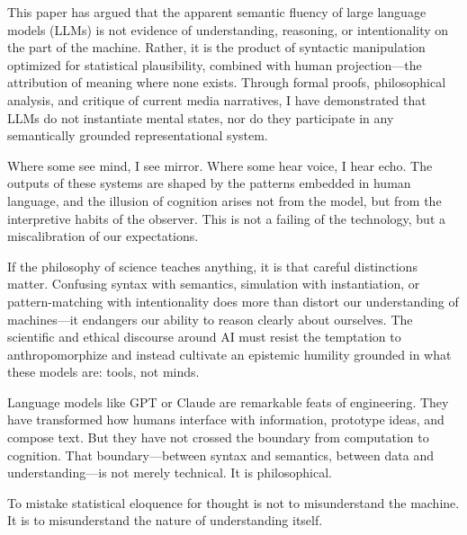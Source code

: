\documentclass[12pt]{article}
\theoremstyle{plain}
\theoremstyle{definition}
\theoremstyle{remark}
\begin{document}
This paper has argued that the apparent semantic fluency of large language models (LLMs) is not evidence of understanding, reasoning, or intentionality on the part of the machine. Rather, it is the product of syntactic manipulation optimized for statistical plausibility, combined with human projection—the attribution of meaning where none exists. Through formal proofs, philosophical analysis, and critique of current media narratives, I have demonstrated that LLMs do not instantiate mental states, nor do they participate in any semantically grounded representational system.

Where some see mind, I see mirror. Where some hear voice, I hear echo. The outputs of these systems are shaped by the patterns embedded in human language, and the illusion of cognition arises not from the model, but from the interpretive habits of the observer. This is not a failing of the technology, but a miscalibration of our expectations.

If the philosophy of science teaches anything, it is that careful distinctions matter. Confusing syntax with semantics, simulation with instantiation, or pattern-matching with intentionality does more than distort our understanding of machines—it endangers our ability to reason clearly about ourselves. The scientific and ethical discourse around AI must resist the temptation to anthropomorphize and instead cultivate an epistemic humility grounded in what these models are: tools, not minds.

Language models like GPT or Claude are remarkable feats of engineering. They have transformed how humans interface with information, prototype ideas, and compose text. But they have not crossed the boundary from computation to cognition. That boundary—between syntax and semantics, between data and understanding—is not merely technical. It is philosophical.

To mistake statistical eloquence for thought is not to misunderstand the machine. It is to misunderstand the nature of understanding itself.


\newpage
\printbibliography
\end{document}
